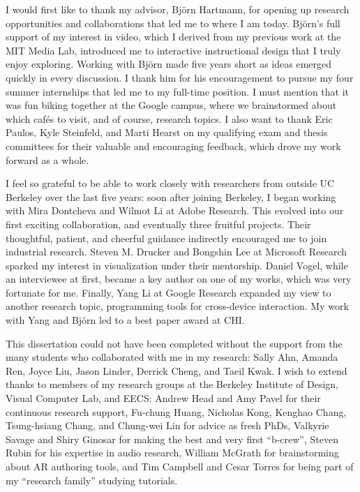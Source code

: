 \begin{acknowledgements}

I would first like to thank my advisor, Bj\"orn Hartmann, for opening up research opportunities and collaborations that led me to where I am today.
%
Bj\"orn's full support of my interest in video, which I derived from my previous work at the MIT Media Lab, introduced me to interactive instructional design that I truly enjoy exploring. Working with Bj\"orn made five years short as ideas emerged quickly in every discussion. I thank him for his encouragement to pursue my four summer internships that led me to my full-time position. I must mention that it was fun biking together at the Google campus, where we brainstormed about which caf\'{e}s to visit, and of course, research topics.
I also want to thank Eric Paulos, Kyle Steinfeld, and Marti Hearst on my qualifying exam and thesis committees for their valuable and encouraging feedback, which drove my work forward as a whole.

I feel so grateful to be able to work closely with researchers from outside UC Berkeley over the last five years: soon after joining Berkeley, I began working with Mira Dontcheva and Wilmot Li at Adobe Research. This evolved into our first exciting collaboration, and eventually three fruitful projects. Their thoughtful, patient, and cheerful guidance indirectly encouraged me to join industrial research.
%
Steven M. Drucker and Bongshin Lee at Microsoft Research sparked my interest in visualization under their mentorship.
%
Daniel Vogel, while an interviewee at first, became a key author on one of my works, which was very fortunate for me.
%
Finally, Yang Li at Google Research expanded my view to another research topic, programming tools for cross-device interaction. My work with Yang and Bj\"orn led to a best paper award at CHI.

This dissertation could not have been completed without the support from the many students who collaborated with me in my research: Sally Ahn, Amanda Ren, Joyce Liu, Jason Linder, Derrick Cheng, and Taeil Kwak. I wish to extend thanks to members of my research groups at the Berkeley Institute of Design, Visual Computer Lab, and EECS: Andrew Head and Amy Pavel for their continuous research support, Fu-chung Huang, Nicholas Kong, Kenghao Chang, Tsung-hsiang Chang, and Chung-wei Lin for advice as fresh PhDs, Valkyrie Savage and Shiry Ginosar for making the best and very first ``b-crew'', Steven Rubin for his expertise in audio research, William McGrath for brainstorming about AR authoring tools, and Tim Campbell and Cesar Torres for being part of my ``research family'' studying tutorials.


\end{acknowledgements}
